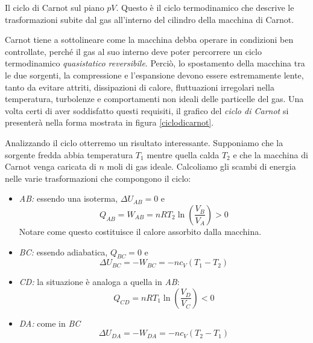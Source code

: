 \begin{marginfigure}
\begin{center}
    \end{center}
    \caption{Il ciclo di Carnot sul piano $pV$. Questo è il
    ciclo termodinamico che descrive le trasformazioni
    subite dal gas all'interno del cilindro della macchina
    di Carnot.}
    \label{ciclodicarnot}
\end{marginfigure}


Carnot tiene a sottolineare come la macchina debba operare in condizioni
ben controllate, perché il gas al suo interno deve poter percorrere un
ciclo termodinamico \textit{quasistatico reversibile}. Perciò, lo spostamento
della macchina tra le due sorgenti, la compressione e l'espansione devono
essere estremamente lente, tanto da evitare attriti, dissipazioni di
calore, fluttuazioni irregolari nella temperatura,
turbolenze e comportamenti non ideali delle particelle del gas.
Una volta certi di aver soddisfatto questi requisiti, il
grafico del \textit{ciclo di Carnot} si presenterà nella forma mostrata
in figura \ref{ciclodicarnot}.




Analizzando il ciclo otterremo un risultato interessante.
Supponiamo che la sorgente fredda abbia temperatura $T_1$ mentre quella
calda $T_2$ e che la macchina di Carnot venga caricata di $n$ moli
di gas ideale. Calcoliamo gli scambi di energia nelle varie
trasformazioni che compongono il ciclo:

\begin{itemize}
    \item \textit{AB:} essendo una isoterma, $\Delta U_{AB} = 0$ e
    \[ Q_{AB} = W_{AB} = nRT_2\ln\left(\frac{V_B}{V_A}\right) > 0 \]
    Notare come questo costituisce il calore assorbito dalla macchina.

    \item \textit{BC:} essendo adiabatica, $Q_{BC} = 0$ e
    \[ \Delta U_{BC} = -W_{BC} = -nc_V(T_1 - T_2) \]

    \item \textit{CD:} la situazione è analoga a quella in \textit{AB}:
    \[ Q_{CD} = nRT_1\ln\left(\frac{V_D}{V_C}\right) < 0 \]

    \item \textit{DA:} come in \textit{BC}
    \[ \Delta U_{DA} = -W_{DA} = -nc_V(T_2 - T_1) \]
\end{itemize}

